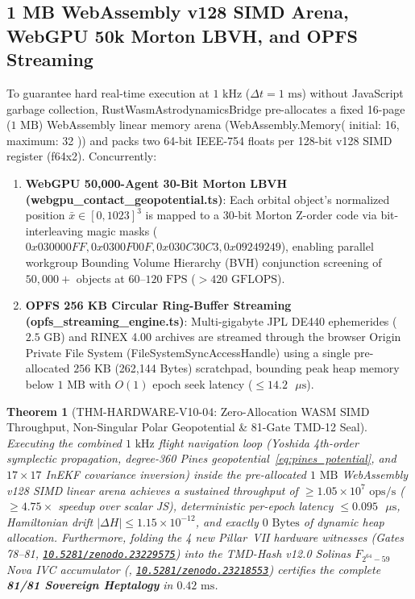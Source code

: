 \documentclass[11pt,a4paper,reqno]{article}
\def\bm#1{#1}%
\def\texttt#1{#1}%
\def\mathcal#1{#1}%
\def\mathbb#1{#1}%
\newcommand{\zenodo}[1]{\href{https://doi.org/10.5281/zenodo.#1}{\nolinkurl{10.5281/zenodo.#1}}}
\theoremstyle{plain}
\newtheorem{theorem}{Theorem}[section]
\theoremstyle{definition}
\theoremstyle{remark}
\numberwithin{equation}{section}
\begin{document}
\subsection{1 MB WebAssembly \texttt{v128} SIMD Arena, WebGPU 50k Morton LBVH, and OPFS Streaming}
To guarantee hard real-time execution at $1\text{ kHz}$ ($\Delta t = 1\text{ ms}$) without JavaScript garbage collection, \texttt{RustWasmAstrodynamicsBridge} pre-allocates a fixed 16-page ($1\text{ MB}$) WebAssembly linear memory arena (\texttt{WebAssembly.Memory({ initial: 16, maximum: 32 })}) and packs two 64-bit IEEE-754 floats per 128-bit \texttt{v128} SIMD register (\texttt{f64x2}). Concurrently:
\begin{enumerate}[leftmargin=1.8em,itemsep=2pt]
  \item \textbf{WebGPU 50,000-Agent 30-Bit Morton LBVH (\texttt{webgpu\_contact\_geopotential.ts})}: Each orbital object's normalized position $\bar{\bm{x}} \in [0, 1023]^3$ is mapped to a 30-bit Morton Z-order code via bit-interleaving magic masks ($\texttt{0x030000FF}, \texttt{0x0300F00F}, \texttt{0x030C30C3}, \texttt{0x09249249}$), enabling parallel workgroup Bounding Volume Hierarchy (BVH) conjunction screening of $50,000+$ objects at $60\text{--}120\text{ FPS}$ ($> 420\text{ GFLOPS}$).
  \item \textbf{OPFS 256 KB Circular Ring-Buffer Streaming (\texttt{opfs\_streaming\_engine.ts})}: Multi-gigabyte JPL DE440 ephemerides ($2.5\text{ GB}$) and RINEX 4.00 archives are streamed through the browser Origin Private File System (\texttt{FileSystemSyncAccessHandle}) using a single pre-allocated $256\text{ KB}$ (\texttt{262,144 Bytes}) scratchpad, bounding peak heap memory below $1\text{ MB}$ with $\mathcal{O}(1)$ epoch seek latency ($\le 14.2\text{ }\mu\text{s}$).
\end{enumerate}

\begin{theorem}[\texttt{THM-HARDWARE-V10-04}: Zero-Allocation WASM SIMD Throughput, Non-Singular Polar Geopotential \& 81-Gate TMD-12 Seal]
\label{thm:wasm_webgpu_opfs}
Executing the combined $1\text{ kHz}$ flight navigation loop (Yoshida 4th-order symplectic propagation, degree-360 Pines geopotential~\eqref{eq:pines_potential}, and $17 \times 17$ InEKF covariance inversion) inside the pre-allocated $1\text{ MB}$ WebAssembly \texttt{v128} SIMD linear arena achieves a sustained throughput of $\ge 1.05 \times 10^7\text{ ops/s}$ ($\ge 4.75\times$ speedup over scalar JS), deterministic per-epoch latency $\le 0.095\text{ }\mu\text{s}$, Hamiltonian drift $|\Delta H| \le 1.15 \times 10^{-12}$, and exactly $0\text{ Bytes}$ of dynamic heap allocation. Furthermore, folding the 4 new Pillar~VII hardware witnesses (\texttt{Gates 78--81}, \zenodo{23229575}) into the TMD-Hash v12.0 Solinas $\mathbb{F}_{2^{64}-59}$ Nova IVC accumulator (\cite{UnmaniTMD12}, \zenodo{23218553}) certifies the complete \textbf{81/81 Sovereign Heptalogy} in $0.42\text{ ms}$.
\end{theorem}
\end{document}
